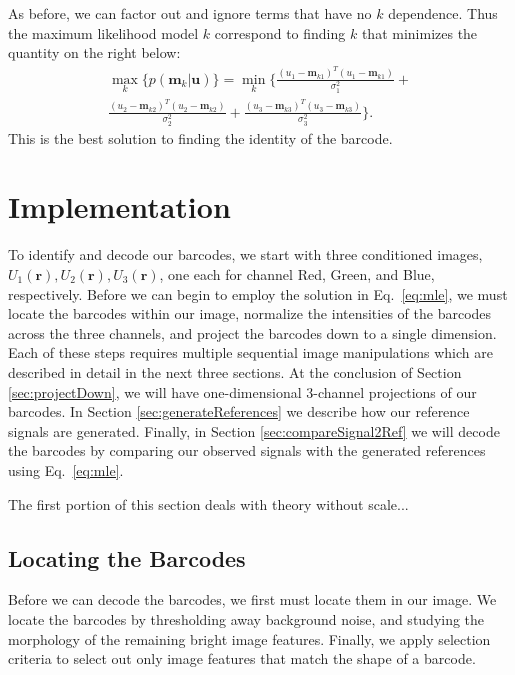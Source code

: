 As before, we can factor out and ignore terms that have no $k$ dependence. Thus the maximum likelihood model $k$ correspond to finding $k$ that minimizes the quantity on the right below:
\begin{multline}\label{eq:mle}
\max_k   \big\{ p(\mathbf{m}_k|\mathbf{u}) \big\} =  \min_k  \Bigg\{  \frac{(u_1-\mathbf{m}_{k1})^T(u_1-\mathbf{m}_{k1})}{\sigma_1^2} +\\  
\frac{(u_2-\mathbf{m}_{k2})^T(u_2-\mathbf{m}_{k2})}{\sigma_2^2} + \frac{(u_3-\mathbf{m}_{k3})^T(u_3-\mathbf{m}_{k3})}{\sigma_3^2} \Bigg\}. 
\end{multline}
This is the best solution to finding the identity of the barcode.

\section{Implementation}
To identify and decode our barcodes, we start with three conditioned images, $U_1(\mathbf{r}), U_2(\mathbf{r}), U_3(\mathbf{r})$, one each for channel Red, Green, and Blue, respectively.  Before we can begin to employ the solution in Eq.~\ref{eq:mle}, we must locate the barcodes within our image, normalize the intensities of the barcodes across the three channels, and project the barcodes down to a single dimension. Each of these steps requires multiple sequential image manipulations which are described in detail in the next three sections. At the conclusion of Section \ref{sec:projectDown}, we will  have one-dimensional 3-channel projections of our barcodes. In Section \ref{sec:generateReferences} we describe how our reference signals are generated. Finally, in Section \ref{sec:compareSignal2Ref} we will decode the barcodes by comparing our observed signals with the generated references  using Eq.~\ref{eq:mle}.

The first  portion of this section deals with theory without scale... 

\subsection{Locating the Barcodes} \label{sec:locatingBarcodes}
Before we can decode the barcodes, we first must locate them in our image. We locate the barcodes by thresholding away background noise, and studying the morphology of the remaining bright image features. Finally, we apply selection criteria to select out only image features that match the shape of a barcode. 

